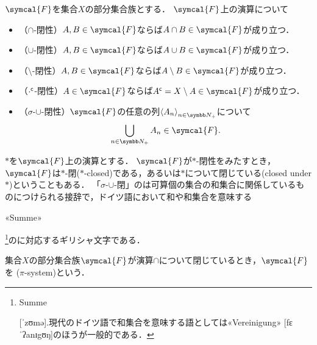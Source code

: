 \documentclass[../main.tex]{subfiles}
\begin{document}
\(\symcal{F}\)を集合\(X\)の部分集合族とする．
\(\symcal{F}\)上の演算について
\begin{itemize}
    \item （\(\mathord{\cap}\)-閉性）\(A, B \in \symcal{F}\)ならば\(A \cap B \in \symcal{F}\)が成り立つ．
    \item （\(\mathord{\cup}\)-閉性）\(A, B \in \symcal{F}\)ならば\(A \cup B \in \symcal{F}\)が成り立つ．
    \item （\(\mathord{\setminus}\)-閉性）\(A, B \in \symcal{F}\)ならば\(A \setminus B \in \symcal{F}\)が成り立つ．
    \item （\({\mathord{\cdot}}^{\mathsf{c}}\)-閉性）\(A \in \symcal{F}\)ならば\(\setcomp{A} = X \setminus A \in \symcal{F}\)が成り立つ．
    \item （\(\sigma\)-\(\mathord{\cup}\)-閉性）\(\symcal{F}\)の任意の列\(\Sequencen{A}\)について
        \begin{align*}
            \bigcup_{n \in \PositiveInteger} A_n \in \symcal{F}.
        \end{align*}
\end{itemize}
\(\mathord{*}\)を\(\symcal{F}\)上の演算とする．
\(\symcal{F}\)が\(\mathord{*}\)-閉性をみたすとき，\(\symcal{F}\)は\(\mathord{*}\)-閉(\(\mathord{*}\)-closed)である，あるいは\(\mathord{*}\)について閉じている(closed under \(\mathord{*}\))ということもある．
「\(\sigma\)-\(\mathord{\cup}\)-閉」の\emphchar{\(\sigma\)}は可算個の集合の和集合に関係しているものにつけられる接辞で，ドイツ語において和や和集合を意味する\begin{german}«Summe»\end{german}\footnote{\begin{german}Summe\end{german} [ˈzʊmə].現代のドイツ語で和集合を意味する語としては\textgerman{«Vereinigung»} [fɛˈʔanɪgʊŋ]のほうが一般的である．
}のに対応するギリシャ文字である．

\begin{thmbox}
\begin{definition}
集合\(X\)の部分集合族\(\symcal{F}\)が演算\(\mathord{\cap}\)について閉じているとき，\(\symcal{F}\)を
(\(\pi\)-system)という．
\end{definition}
\end{thmbox}
\end{document}

